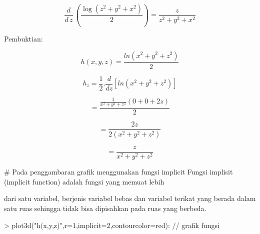 \documentclass[a4paper,10pt]{article}
\begin{document}
\begin{eulernotebook}
\begin{eulercomment}
\begin{eulercomment}
\begin{eulercomment}
\begin{eulercomment}
\begin{eulercomment}
\begin{eulercomment}
\begin{eulerformula}
\[
\frac{d}{d\,z}\,\left(\frac{\log \left(z^2+y^2+x^2\right)}{2}  \right)=\frac{z}{z^2+y^2+x^2}
\]
\end{eulerformula}
\begin{eulerttcomment}
   Pembuktian:
\end{eulerttcomment}
\begin{eulercomment}
\end{eulercomment}
\begin{eulerformula}
\[
h(x,y,z) = \frac {ln(x^2+y^2+z^2)} {2}
\]
\end{eulerformula}
\begin{eulercomment}
\end{eulercomment}
\begin{eulerformula}
\[
h_z = \frac {1} {2} . \frac {d} {dz} [ln(x^2+y^2+z^2)]
\]
\end{eulerformula}
\begin{eulercomment}
\end{eulercomment}
\begin{eulerformula}
\[
= \frac {\frac {1} {x^2+y^2+z^2} (0+0+2z)} {2}
\]
\end{eulerformula}
\begin{eulercomment}
\end{eulercomment}
\begin{eulerformula}
\[
= \frac {2z} {2(x^2+y^2+z^2)}
\]
\end{eulerformula}
\begin{eulercomment}
\end{eulercomment}
\begin{eulerformula}
\[
= \frac {z} {x^2+y^2+z^2}
\]
\end{eulerformula}
\begin{eulercomment}
\end{eulercomment}
\begin{eulerttcomment}
   # Pada penggambaran grafik menggunakan fungsi implicit
 Fungsi implisit (implicit function) adalah fungsi yang memuat lebih
\end{eulerttcomment}
\begin{eulercomment}
dari satu variabel, berjenis variabel bebas dan variabel terikat yang
berada dalam satu ruas sehingga tidak bisa dipisahkan pada ruas yang
berbeda.
\end{eulercomment}
\begin{eulerprompt}
> plot3d("h(x,y,z)",r=1,implicit=2,contourcolor=red): // grafik fungsi

\end{eulerprompt}
\end{eulercomment}
\end{eulercomment}
\end{eulercomment}
\end{eulercomment}
\end{eulercomment}
\end{eulercomment}
\end{eulernotebook}
\end{document}
